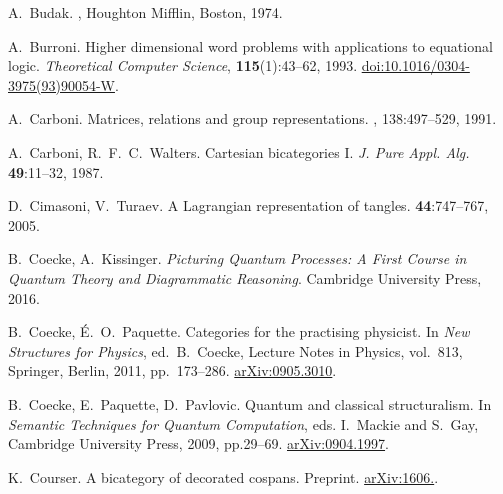 \begin{thebibliography}{RSW00}
    A.\ Budak.
    , Houghton Mifflin, Boston, 1974.

    A.\ Burroni.
    \newblock Higher dimensional word problems with
    applications to equational logic.
    \newblock \textsl{Theoretical Computer Science}, {\bf 115}(1):43--62, 1993.
    \newblock \href{http://dx.doi.org/10.1016/0304-3975(93)90054-W}{doi:10.1016/0304-3975(93)90054-W}.



    A.\ Carboni.
    \newblock Matrices, relations and group representations.
    , 138:497--529, 1991.

    A.\ Carboni, R.\ F.\ C.\ Walters.
    \newblock Cartesian bicategories I.
    \newblock \textsl{J. Pure Appl. Alg.} {\bf 49}:11--32, 1987. 

    D.\ Cimasoni, V.\ Turaev.
    \newblock A Lagrangian representation of tangles.
     {\bf 44}:747--767, 2005.

    B.\ Coecke, A.\ Kissinger.
    \newblock \textsl{Picturing Quantum Processes: A First Course in Quantum Theory and Diagrammatic Reasoning}.
    \newblock Cambridge University Press, 2016.

    B.\ Coecke, \'E.\ O.\ Paquette.
    \newblock Categories for the practising physicist.
    \newblock In {\sl New Structures for Physics}, ed.\ B.\ Coecke,  
    Lecture Notes in Physics, vol.\ 813, Springer, Berlin, 2011, pp.\ 173--286.
    \newblock \href{http://arxiv.org/abs/0905.3010}{arXiv:0905.3010}.

    B.\ Coecke, E.\ Paquette, D.\ Pavlovic.
    \newblock Quantum and classical structuralism.
    \newblock In \textsl{Semantic Techniques for Quantum
    Computation}, eds. I.\ Mackie and S.\ Gay, Cambridge University Press, 2009,
    pp.29--69.
    \newblock \href{http://arxiv.org/abs/0904.1997}{arXiv:0904.1997}.

    K.\ Courser.
    \newblock A bicategory of decorated cospans.
    \newblock Preprint. 
    \newblock \href{http://arxiv.org/abs/1606.}{arXiv:1606.}.


\end{thebibliography}
